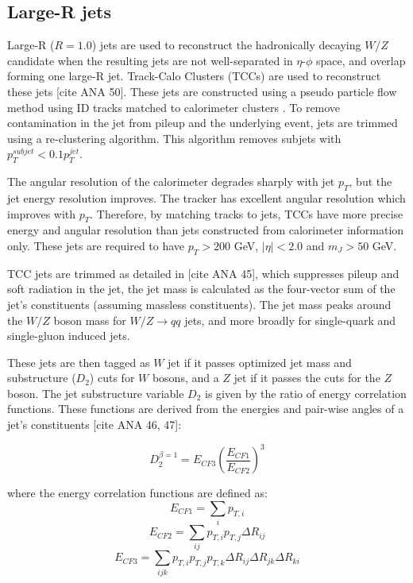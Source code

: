 \subsection{Large-R jets}
Large-R ($R = 1.0$) jets are used to reconstruct the hadronically decaying $W/Z$ candidate when the resulting jets are not well-separated in $\eta$-$\phi$ space, and overlap forming one large-R jet. Track-Calo Clusters (TCCs) are used to reconstruct these jets [cite ANA 50]. These jets are constructed using a pseudo particle flow method using ID tracks matched to calorimeter clusters \cite{particleflow}. To remove contamination in the jet from pileup and the underlying event, jets are trimmed using a re-clustering algorithm. This algorithm removes subjets with $p_{T}^{subjet} < 0.1p_{T}^{jet}$. 

The angular resolution of the calorimeter degrades sharply with jet $p_{T}$, but the jet energy resolution improves. The tracker has excellent angular resolution which improves with $p_{T}$. Therefore, by matching tracks to jets, TCCs have more precise energy and angular resolution than jets constructed from calorimeter information only. These jets are required to have $p_{T}>200$ GeV, $|\eta| < 2.0$ and $m_{J} > 50$ GeV. 

TCC jets are trimmed as detailed in [cite ANA 45], which suppresses pileup and soft radiation in the jet, the jet mass is calculated as the four-vector sum of the jet's constituents (assuming massless constituents). The jet mass peaks around the $W/Z$ boson mass for $W/Z \rightarrow qq$ jets, and more broadly for single-quark and single-gluon induced jets. 

These jets are then tagged as $W$ jet if it passes optimized jet mass and substructure ($D_{2}$) cuts for $W$ bosons, and a $Z$ jet if it passes the cuts for the $Z$ boson. The jet substructure variable $D_{2}$ is given by the ratio of energy correlation functions. These functions are derived from the energies and pair-wise angles of a jet's constituents [cite ANA 46, 47]:

\begin{equation}
D_{2}^{\beta=1} = E_{CF3}\left(\frac{E_{CF1}}{E_{CF2}}\right)^{3}
\end{equation}

where the energy correlation functions are defined as:
\begin{equation}
E_{CF1}=\sum_{i}p_{T,i}
\end{equation}
\begin{equation}
E_{CF2}=\sum_{ij}p_{T,i}p_{T,j}\Delta R_{ij}
\end{equation}
\begin{equation}
E_{CF3}=\sum_{ijk}p_{T,i}p_{T,j}p_{T,k}\Delta R_{ij}\Delta R_{jk}\Delta R_{ki}
\end{equation}


